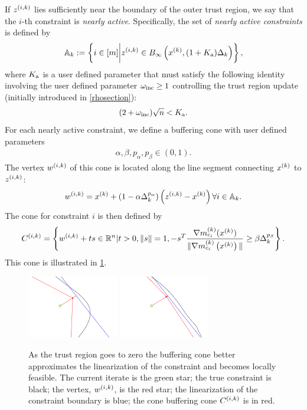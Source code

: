If ${z^{(i, k)}}$ lies sufficiently near the boundary of the outer trust region, we say that the $i$-th constraint is \emph{nearly active}.
Specifically, the set of {\em nearly active constraints} is defined by
\begin{align}
{\mathbb A_{k}} := \left\{i \in [m] \bigg| {z^{(i, k)}} \in B_{\infty}\left(x^{(k)}, (1+{ K_{\textrm{a}} })\Delta_k\right)\right\}, \label{define_activeconstraints}
\end{align}
where ${ K_{\textrm{a}} }$ is a user defined parameter that must satisfy the following identity involving 
the user defined parameter $\omega_{\text{inc}} \ge 1$ controlling the trust region update (initially introduced in \cref{rhosection}):
\begin{align}
(2 + \omega_{\text{inc}})\sqrt{n} < { K_{\textrm{a}} }. \label{define_zikthresh}
\end{align}
For each nearly active constraint, we define a buffering cone with user defined parameters
\begin{align}
\alpha, \beta, p_{\alpha}, p_{\beta} \in (0, 1). \label{define_abpab}
\end{align}
The vertex ${w^{(i, k)}}$ of this cone is located along the line segment connecting $x^{(k)}$ to ${z^{(i, k)}}$:
\begin{align}
{w^{(i, k)}} = x^{(k)} + \left(1 - \alpha\Delta_k^{p_{\alpha}}\right)\left({z^{(i, k)}} - x^{(k)}\right) \forall i \in {\mathbb A_{k}}. \label{define_w}
\end{align}
The cone for constraint $i$ is then defined by
\begin{align}
{C^{(i, k)}} = \left\{{w^{(i, k)}} + t s \in \mathbb R^n | t > 0, \|s\| = 1, -s^T{\frac{\nabla m^{(k)}_{c_i}(x^{(k)})}{\|\nabla m^{(k)}_{c_i}\left(x^{(k)}\right)\|}} \ge \beta \Delta_k^{p_{\beta}} \right\}. \label{define_fik}
\end{align}
This cone is illustrated in \cref{explanation_2}.  
\begin{figure}[ht]
    \centering
    \includegraphics[width=150px]{images/explanation_2.png}
    \includegraphics[width=150px]{images/explanation_3.png}
    \caption[An example of a buffering cone.]{
    	As the trust region goes to zero the buffering cone better approximates the linearization of the constraint and becomes locally feasible.
    	The current iterate is the green star;
    	the true constraint is black;
    	the vertex, ${w^{(i, k)}}$, is the red star;
    	the linearization of the constraint boundary is blue;
    	the cone buffering cone ${C^{(i, k)}}$ is in red.
	}
    \label{explanation_2}
\end{figure}

